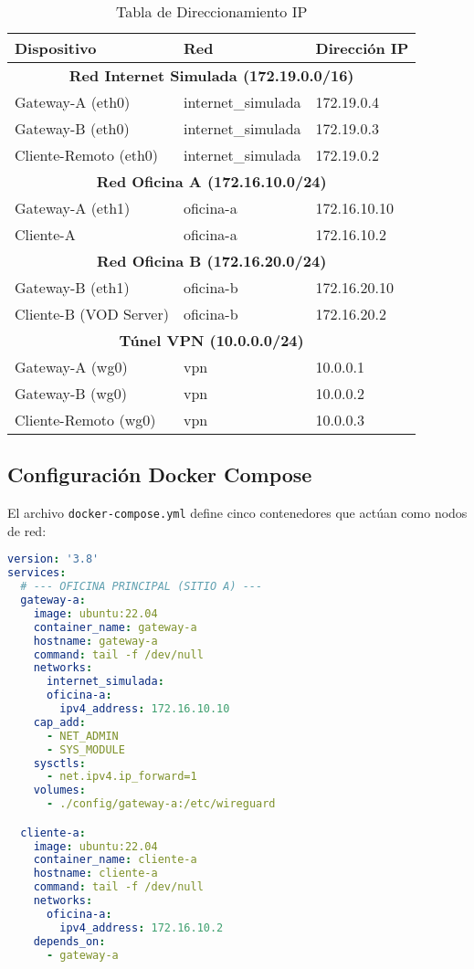 \begin{table}[H]
    \centering
    \small
    \caption{Tabla de Direccionamiento IP}
    \label{tab:ip_addressing}
    \begin{tabular}{|l|l|l|}
        \hline
        \textbf{Dispositivo} & \textbf{Red} & \textbf{Dirección IP} \\
        \hline
        \multicolumn{3}{|c|}{\textbf{Red Internet Simulada (172.19.0.0/16)}} \\
        \hline
        Gateway-A (eth0) & internet\_simulada & 172.19.0.4 \\
        Gateway-B (eth0) & internet\_simulada & 172.19.0.3 \\
        Cliente-Remoto (eth0) & internet\_simulada & 172.19.0.2 \\
        \hline
        \multicolumn{3}{|c|}{\textbf{Red Oficina A (172.16.10.0/24)}} \\
        \hline
        Gateway-A (eth1) & oficina-a & 172.16.10.10 \\
        Cliente-A & oficina-a & 172.16.10.2 \\
        \hline
        \multicolumn{3}{|c|}{\textbf{Red Oficina B (172.16.20.0/24)}} \\
        \hline
        Gateway-B (eth1) & oficina-b & 172.16.20.10 \\
        Cliente-B (VOD Server) & oficina-b & 172.16.20.2 \\
        \hline
        \multicolumn{3}{|c|}{\textbf{Túnel VPN (10.0.0.0/24)}} \\
        \hline
        Gateway-A (wg0) & vpn & 10.0.0.1 \\
        Gateway-B (wg0) & vpn & 10.0.0.2 \\
        Cliente-Remoto (wg0) & vpn & 10.0.0.3 \\
        \hline
    \end{tabular}
\end{table}

\subsection{Configuración Docker Compose}

El archivo \texttt{docker-compose.yml} define cinco contenedores que actúan como nodos de red:

\begin{lstlisting}[language=yaml, caption=Configuración Docker Compose principal]
version: '3.8'
services:
  # --- OFICINA PRINCIPAL (SITIO A) ---
  gateway-a:
    image: ubuntu:22.04
    container_name: gateway-a
    hostname: gateway-a
    command: tail -f /dev/null
    networks:
      internet_simulada:
      oficina-a:
        ipv4_address: 172.16.10.10
    cap_add:
      - NET_ADMIN
      - SYS_MODULE
    sysctls:
      - net.ipv4.ip_forward=1
    volumes:
      - ./config/gateway-a:/etc/wireguard

  cliente-a:
    image: ubuntu:22.04
    container_name: cliente-a
    hostname: cliente-a
    command: tail -f /dev/null
    networks:
      oficina-a:
        ipv4_address: 172.16.10.2
    depends_on:
      - gateway-a
\end{lstlisting}

